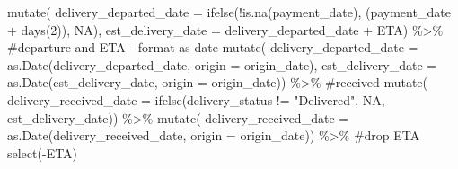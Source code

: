 \documentclass[
  letterpaper,
  DIV=11,
  numbers=noendperiod]{scrartcl}
\newenvironment{Shaded}{\begin{snugshade}}{\end{snugshade}}
\newcommand{\AttributeTok}[1]{\textcolor[rgb]{0.40,0.45,0.13}{#1}}
\newcommand{\CommentTok}[1]{\textcolor[rgb]{0.37,0.37,0.37}{#1}}
\newcommand{\ConstantTok}[1]{\textcolor[rgb]{0.56,0.35,0.01}{#1}}
\newcommand{\DecValTok}[1]{\textcolor[rgb]{0.68,0.00,0.00}{#1}}
\newcommand{\FunctionTok}[1]{\textcolor[rgb]{0.28,0.35,0.67}{#1}}
\newcommand{\NormalTok}[1]{\textcolor[rgb]{0.00,0.23,0.31}{#1}}
\newcommand{\SpecialCharTok}[1]{\textcolor[rgb]{0.37,0.37,0.37}{#1}}
\newcommand{\StringTok}[1]{\textcolor[rgb]{0.13,0.47,0.30}{#1}}
\begin{document}
\begin{Shaded}
\begin{Highlighting}[numbers=left,,]
  \FunctionTok{mutate}\NormalTok{(}
    \AttributeTok{delivery\_departed\_date =} 
      \FunctionTok{ifelse}\NormalTok{(}\SpecialCharTok{!}\FunctionTok{is.na}\NormalTok{(payment\_date), (payment\_date }\SpecialCharTok{+} \FunctionTok{days}\NormalTok{(}\DecValTok{2}\NormalTok{)), }\ConstantTok{NA}\NormalTok{),}
    \AttributeTok{est\_delivery\_date =}\NormalTok{ delivery\_departed\_date }\SpecialCharTok{+}\NormalTok{ ETA) }\SpecialCharTok{\%\textgreater{}\%}
  \CommentTok{\#departure and ETA {-} format as date}
  \FunctionTok{mutate}\NormalTok{(}
    \AttributeTok{delivery\_departed\_date =} 
      \FunctionTok{as.Date}\NormalTok{(delivery\_departed\_date, }\AttributeTok{origin =}\NormalTok{ origin\_date),}
    \AttributeTok{est\_delivery\_date =} 
      \FunctionTok{as.Date}\NormalTok{(est\_delivery\_date, }\AttributeTok{origin =}\NormalTok{ origin\_date)) }\SpecialCharTok{\%\textgreater{}\%}
  \CommentTok{\#received}
  \FunctionTok{mutate}\NormalTok{(}
    \AttributeTok{delivery\_received\_date =} 
      \FunctionTok{ifelse}\NormalTok{(delivery\_status }\SpecialCharTok{!=} \StringTok{"Delivered"}\NormalTok{, }\ConstantTok{NA}\NormalTok{, est\_delivery\_date)) }\SpecialCharTok{\%\textgreater{}\%}
  \FunctionTok{mutate}\NormalTok{(}
    \AttributeTok{delivery\_received\_date =} 
      \FunctionTok{as.Date}\NormalTok{(delivery\_received\_date, }\AttributeTok{origin =}\NormalTok{ origin\_date)) }\SpecialCharTok{\%\textgreater{}\%}
  \CommentTok{\#drop ETA}
  \FunctionTok{select}\NormalTok{(}\SpecialCharTok{{-}}\NormalTok{ETA)}


\end{Highlighting}
\end{Shaded}
\end{document}
